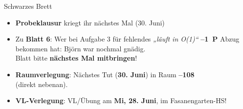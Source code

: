 
\begin{frame}{Schwarzes Brett}
	\begin{itemize}
		\item \textbf{Probeklausur} kriegt ihr nächstes Mal {\small (30. Juni)}
		\item Zu \textbf{Blatt 6}: Wer bei Aufgabe 3 für fehlendes \textit{„läuft in O(1)“} \textbf{–1~P} Abzug bekommen hat: Björn war nochmal gnädig. \smiley \\
		\impl Blatt bitte \textbf{nächstes Mal mitbringen}! 
		\item \textbf{Raumverlegung}: Nächstes Tut (\textbf{30. Juni}) in Raum \textbf{–108} \\ 
		(direkt nebenan).
		\item \textbf{VL-Verlegung}: VL/Übung am \textbf{Mi, 28. Juni}, im Fasanengarten-HS!
	\end{itemize}
\end{frame}


\iffalse

\begin{frame}{Zum letzten Übungsblatt}
\textbf{Achtung bei der Wahl von Datenstrukturen} \\[0,125cm]
\begin{itemize}
	\pause
	\item Aufgabenstellung spezifiziert nicht, ob eine Menge von Daten als Array oder Liste gegeben ist \impl Beides darf als Parametertyp gewählt werden
	\pause
	\item Aber: Wenn über die Daten iteriert wird, folgendes beachten:
	\pause
	\item Listen bieten Indexzugriff i.A. \textbf{nicht in konstanter Zeit}! D.h. wenn man „via Index“ über eine Liste iteriert, hat die Iteration eine Laufzeit von $\Theta(n^2)$
	\pause
	\item Daher: Iteration bei Arrays frei via Index oder \textit{for-each}, bei Listen \textbf{nur} \textit{for-each}, wenn die Laufzeit wichtig ist (bei Arrays und Listen kann davon ausgegangen werden, dass \textit{for-each} die Daten in linearer Reihenfolge durchläuft)
\end{itemize}
\end{frame}

\fi